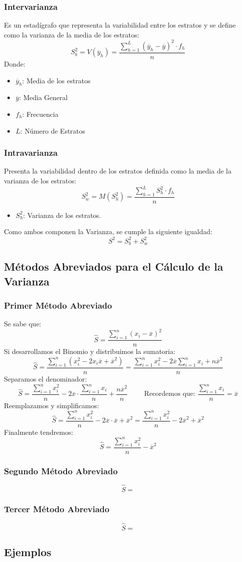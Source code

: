 \subsubsection{Intervarianza}
Es un estadígrafo que representa la variabilidad entre los estratos y se define como la varianza de la media de los estratos:
$$S_b^2=V(\overline{y}_h)=\dfrac{\displaystyle\sum_{h=1}^{L}(\overline{y}_h-\overline{y})^2 \cdot f_h}{n}$$
Donde:
\begin{itemize}
\item $\overline{y}_h$: Media de los estratos
\item $\overline{y}$: Media General 
\item $f_h$: Frecuencia
\item $L$: Número de Estratos
\end{itemize}
\subsubsection{Intravarianza}
Presenta la variabilidad dentro de los estratos definida como la media de la varianza de los estratos:
$$S_w^2=M(S_h^2)=\dfrac{\displaystyle\sum_{h=1}^{L}S_h^2 \cdot f_h}{n}$$
\begin{itemize}
\item $S_h^2$: Varianza de los estratos.
\end{itemize}
Como ambos componen la Varianza, se cumple la siguiente igualdad:
$$S^2=S_b^2+S_w^2$$
\subsection{Métodos Abreviados para el Cálculo de la Varianza}
\subsubsection{Primer Método Abreviado}
\noindent Se sabe que:
$$\hat{S}=\dfrac{\displaystyle\sum_{i=1}^{n}(x_i-\overline{x})^2}{n}$$
Si desarrollamos el Binomio y distribuimos la sumatoria:
$$\hat{S}=\dfrac{\displaystyle\sum_{i=1}^{n}(x_i^2-2x_i\overline{x}+\overline{x}^2)}{n}=
\dfrac{\displaystyle\sum_{i=1}^{n}x_i^2 - 2\overline{x}\displaystyle\sum_{i=1}^{n}x_i+n\overline{x}^2}{n}
$$
Separamos el denominador:
$$\hat{S}=\dfrac{\displaystyle\sum_{i=1}^{n}x_i^2}{n}-2\overline{x}\cdot\dfrac{\displaystyle\sum_{i=1}^{n}x_i}{n}+\dfrac{n\overline{x}^2}{n} \hspace{1cm} \textrm{Recordemos que: } \dfrac{\displaystyle\sum_{i=1}^{n}x_i}{n}=\overline{x}$$
Reemplazamos y simplificamos:
$$\hat{S}=\dfrac{\displaystyle\sum_{i=1}^{n}x_i^2}{n}-2\overline{x}\cdot\overline{x}+\overline{x}^2=\dfrac{\displaystyle\sum_{i=1}^{n}x_i^2}{n}-2\overline{x}^2+\overline{x}^2$$
Finalmente tendremos:
$$\hat{S}=\dfrac{\displaystyle\sum_{i=1}^{n}x_i^2}{n}-\overline{x}^2$$
\subsubsection{Segundo Método Abreviado}
$$\hat{S}=$$
\subsubsection{Tercer Método Abreviado}
$$\hat{S}=$$
\subsection{Ejemplos}